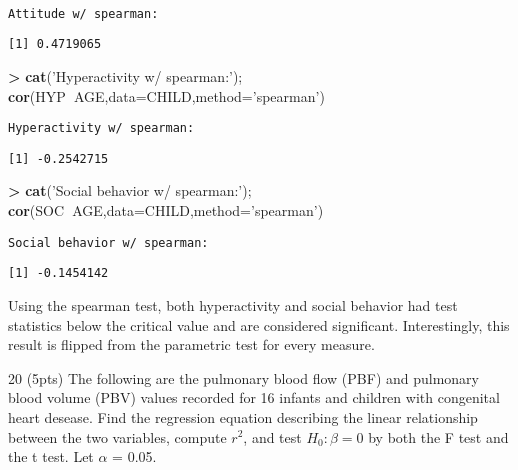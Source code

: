 \documentclass[]{article}
\newenvironment{Shaded}{\begin{snugshade}}{\end{snugshade}}
\newcommand{\KeywordTok}[1]{\textcolor[rgb]{0.13,0.29,0.53}{\textbf{#1}}}
\newcommand{\DataTypeTok}[1]{\textcolor[rgb]{0.13,0.29,0.53}{#1}}
\newcommand{\StringTok}[1]{\textcolor[rgb]{0.31,0.60,0.02}{#1}}
\newcommand{\OperatorTok}[1]{\textcolor[rgb]{0.81,0.36,0.00}{\textbf{#1}}}
\newcommand{\NormalTok}[1]{#1}
\begin{document}
\begin{verbatim}

Attitude w/ spearman:
\end{verbatim}

\begin{verbatim}
[1] 0.4719065
\end{verbatim}

\begin{Shaded}
\begin{Highlighting}[]
\OperatorTok{>}\StringTok{ }\KeywordTok{cat}\NormalTok{(}\StringTok{'Hyperactivity w/ spearman:'}\NormalTok{); }\KeywordTok{cor}\NormalTok{(HYP}\OperatorTok{~}\NormalTok{AGE,}\DataTypeTok{data=}\NormalTok{CHILD,}\DataTypeTok{method=}\StringTok{'spearman'}\NormalTok{)}
\end{Highlighting}
\end{Shaded}

\begin{verbatim}
Hyperactivity w/ spearman:
\end{verbatim}

\begin{verbatim}
[1] -0.2542715
\end{verbatim}

\begin{Shaded}
\begin{Highlighting}[]
\OperatorTok{>}\StringTok{ }\KeywordTok{cat}\NormalTok{(}\StringTok{'Social behavior w/ spearman:'}\NormalTok{); }\KeywordTok{cor}\NormalTok{(SOC}\OperatorTok{~}\NormalTok{AGE,}\DataTypeTok{data=}\NormalTok{CHILD,}\DataTypeTok{method=}\StringTok{'spearman'}\NormalTok{)}
\end{Highlighting}
\end{Shaded}

\begin{verbatim}
Social behavior w/ spearman:
\end{verbatim}

\begin{verbatim}
[1] -0.1454142
\end{verbatim}

Using the spearman test, both hyperactivity and social behavior had test
statistics below the critical value and are considered significant.
Interestingly, this result is flipped from the parametric test for every
measure.

20 (5pts) The following are the pulmonary blood flow (PBF) and pulmonary
blood volume (PBV) values recorded for 16 infants and children with
congenital heart desease. Find the regression equation describing the
linear relationship between the two variables, compute \(r^2\), and test
\(H_0:\beta = 0\) by both the F test and the t test. Let \(\alpha\) =
0.05.
\end{document}
